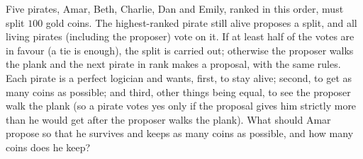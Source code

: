 Five pirates, Amar, Beth, Charlie, Dan and Emily, ranked in this order, must split $100$ gold coins. The highest-ranked pirate still alive proposes a split, and all living pirates (including the proposer) vote on it. If at least half of the votes are in favour (a tie is enough), the split is carried out; otherwise the proposer walks the plank and the next pirate in rank makes a proposal, with the same rules. Each pirate is a perfect logician and wants, first, to stay alive; second, to get as many coins as possible; and third, other things being equal, to see the proposer walk the plank (so a pirate votes yes only if the proposal gives him strictly more than he would get after the proposer walks the plank). What should Amar propose so that he survives and keeps as many coins as possible, and how many coins does he keep?
